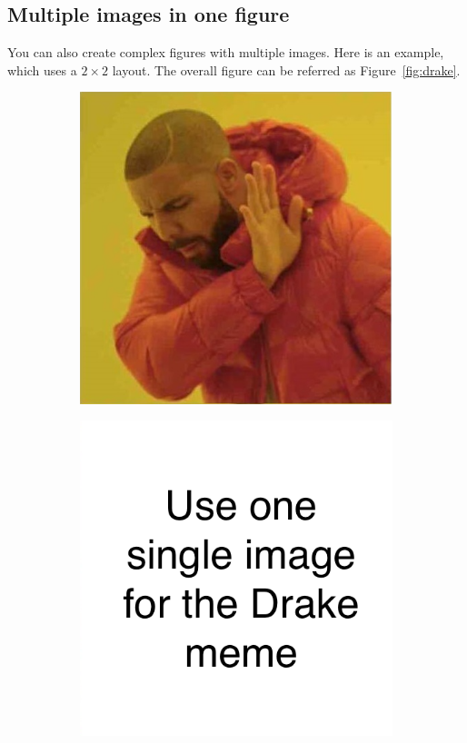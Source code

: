 \subsection{Multiple images in one figure}
You can also create complex figures with multiple images.
Here is an example, which uses a $2\times2$ layout.
The overall figure can be referred as Figure~\ref{fig:drake}.
\begin{figure}[!h]
  \begin{subfigure}[t]{.5\textwidth}
    \centering
    \includegraphics[width=\linewidth]{figures/draketl.png}
  \end{subfigure}
  \hfill
  \begin{subfigure}[t]{.5\textwidth}
    \centering
    \includegraphics[width=\linewidth]{figures/draketr.png}

\end{subfigure}
\end{figure}
